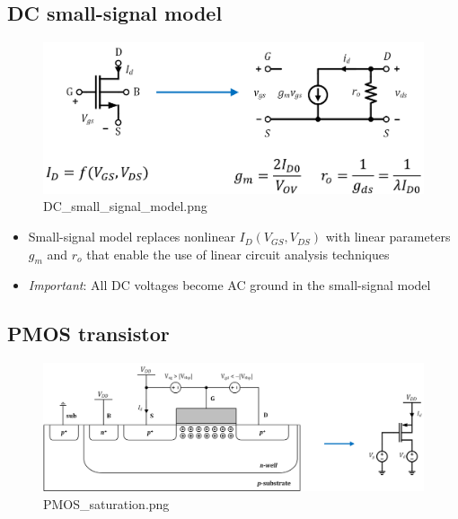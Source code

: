\documentclass[11pt]{article}
\providecommand{\tightlist}{%
      \setlength{\itemsep}{0pt}\setlength{\parskip}{0pt}}
\begin{document}
    \hypertarget{dc-small-signal-model}{%
\subsection{DC small-signal model}\label{dc-small-signal-model}}

    \begin{figure}
\centering
\includegraphics{DC_small_signal_model.png}
\caption{DC\_small\_signal\_model.png}
\end{figure}

    \begin{itemize}
\tightlist
\item
  Small-signal model replaces nonlinear \(I_D(V_{GS}, V_{DS})\) with
  linear parameters \(g_m\) and \(r_o\) that enable the use of linear
  circuit analysis techniques
\item
  \emph{Important}: All DC voltages become AC ground in the small-signal
  model
\end{itemize}

    \hypertarget{pmos-transistor}{%
\subsection{PMOS transistor}\label{pmos-transistor}}

    \begin{figure}
\centering
\includegraphics{PMOS_saturation.png}
\caption{PMOS\_saturation.png}
\end{figure}
\end{document}
